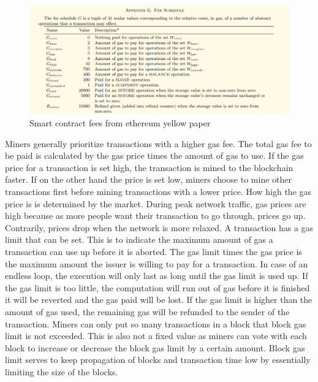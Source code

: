 \begin{figure}[ht!]
  \begin{center}
    \includegraphics[scale=0.6]{Talk7/img/smart_contracts/gas-fees}
  \end{center}
  \caption{Smart contract fees from ethereum yellow paper}
  \label{fig:smart_contract_fees}
\end{figure}

Miners generally prioritize transactions with a higher gas fee. The total gas fee to be paid is calculated by the gas price times the amount of gas to use. If the gas price for a transaction is set high, the transaction is mined to the blockchain faster. If on the other hand the price is set low, miners choose to mine other transactions first
before mining transactions with a lower price. How high the gas price is is determined by the market. During peak network traffic, gas prices are high because as more people want their transaction to go through, prices go up. Contrarily, prices drop when the network is more relaxed.
A transaction has a gas limit that can be set. This is to indicate the maximum amount of gas a transaction can use up before it is aborted. The gas limit times the gas price is the maximum amount the issuer is willing to pay for a transaction. In case of an endless loop, the execution will only last as long until the gas limit is used up.
If the gas limit is too little, the computation will run out of gas before it is finished it will be reverted and the gas paid will be lost. If the gas limit is higher than the amount of gas used, the remaining gas will be refunded to the sender of the transaction.
Miners can only put so many transactions in a block that block gas limit is not exceeded. This is also not a fixed value as miners can vote with each block to increase or decrease the block gas limit by a certain amount. Block gas limit serves to keep propagation of blocks and transaction time low by essentially limiting the size of the blocks.


